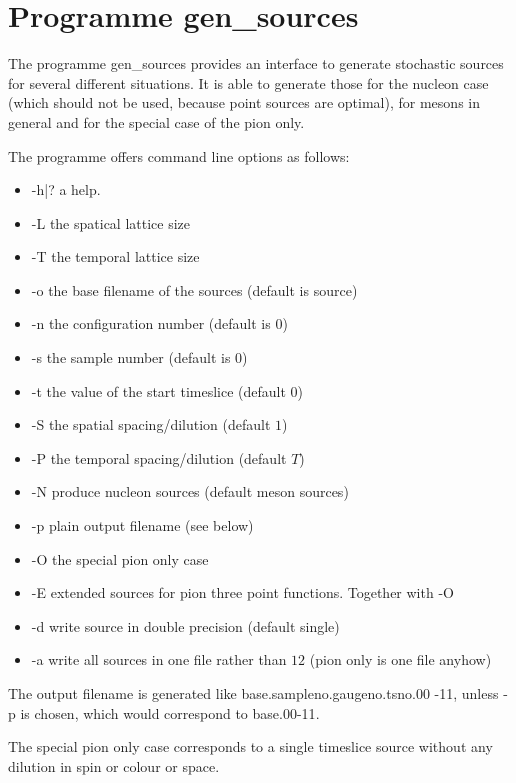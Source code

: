 \section{Programme {\ttfamily gen\_sources}}

The programme {\ttfamily gen\_sources} provides an interface to
generate stochastic sources for several different situations. It is
able to generate those for the nucleon case (which should not be used,
because point sources are optimal), for mesons in general and for the
special case of the pion only.

The programme offers command line options as follows:
\begin{itemize}
\item {\ttfamily -h|?} a help.
\item {\ttfamily -L} the spatical lattice size
\item {\ttfamily -T} the temporal lattice size
\item {\ttfamily -o} the base filename of the sources (default is
  {\ttfamily source})
\item {\ttfamily -n} the configuration number (default is $0$)
\item {\ttfamily -s} the sample number (default is $0$)
\item {\ttfamily -t} the value of the start timeslice (default $0$)
\item {\ttfamily -S} the spatial spacing/dilution (default $1$)
\item {\ttfamily -P} the temporal spacing/dilution (default $T$)
\item {\ttfamily -N} produce nucleon sources (default meson sources)
\item {\ttfamily -p} plain output filename (see below)
\item {\ttfamily -O} the special pion only case
\item {\ttfamily -E} extended sources for pion three point
  functions. Together with {\ttfamily -O}
\item {\ttfamily -d} write source in double precision (default single)
\item {\ttfamily -a} write all sources in one file rather than $12$
  (pion only is one file anyhow)
\end{itemize}
The output filename is generated like {\ttfamily
  base.sampleno.gaugeno.tsno.00 -11}, unless {\ttfamily -p} is chosen,
which would correspond to {\ttfamily base.00-11}.

The special pion only case corresponds to a single timeslice source
without any dilution in spin or colour or space.

\endinput
